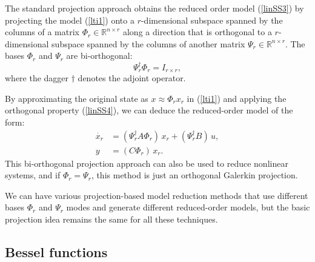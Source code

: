 \documentclass[12pt,lot, lof]{puthesis}
\begin{document}
The standard projection approach obtains the reduced order model (\ref{linSS3}) by projecting the model (\ref{lti1}) onto a $r$-dimensional subspace spanned by the columns of a matrix $\Phi_r \in  \mathbb{R}^{n \times r}$ along a direction that is orthogonal to a $r$-dimensional subspace spanned by the columns of another matrix $\Psi_r \in  \mathbb{R}^{n \times r}$. The bases  $\Phi_r$ and  $\Psi_r$ are bi-orthogonal:
\begin{equation}
\label{linSS4}
\Psi_r^{\dagger} \Phi_r = I_{r \times r},
\end{equation}
where the dagger $\dagger$ denotes the adjoint operator. 

By approximating the original state as $x \approx \Phi_r x_r$ in (\ref{lti1}) and applying the orthogonal property (\ref{linSS4}), we can deduce the reduced-order model of the form:
\begin{equation}
\label{linSS5}
\begin{aligned}
	\dot{x_r}&= \left(\Psi_r^{\dagger} A \Phi_r \right) \,x_r  + \left( \Psi_r^{\dagger} B \right) \, u,   \\
	y &= \left( C  \Phi_r \right) \,x_r.
\end{aligned}
\end{equation}
This bi-orthogonal projection approach can also be used to reduce nonlinear systems, and if $\Phi_r = \Psi_r $, this method is just an orthogonal Galerkin projection. 

We can have various projection-based model reduction methods that use different bases $\Phi_r$ and $\Psi_r$ modes and generate different reduced-order models, but the basic projection idea remains the same for all these techniques.  


\subsection{Bessel functions}
\label{Besselmeth}
\end{document}
